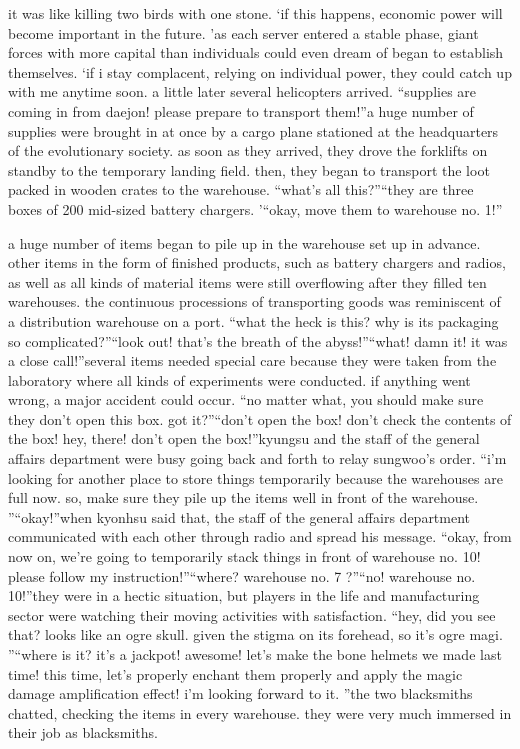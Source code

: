  it was like killing two birds with one stone.
‘if this happens, economic power will become important in the future.
’as each server entered a stable phase, giant forces with more capital than individuals could even dream of began to establish themselves.
‘if i stay complacent, relying on individual power, they could catch up with me anytime soon.
a little later several helicopters arrived.
“supplies are coming in from daejon! please prepare to transport them!”a huge number of supplies were brought in at once by a cargo plane stationed at the headquarters of the evolutionary society.
as soon as they arrived, they drove the forklifts on standby to the temporary landing field.
 then, they began to transport the loot packed in wooden crates to the warehouse.
“what’s all this?”“they are three boxes of 200 mid-sized battery chargers.
’“okay, move them to warehouse no.
 1!”

a huge number of items began to pile up in the warehouse set up in advance.
other items in the form of finished products, such as battery chargers and radios, as well as all kinds of material items were still overflowing after they filled ten warehouses.
the continuous processions of transporting goods was reminiscent of a distribution warehouse on a port.
“what the heck is this? why is its packaging so complicated?”“look out! that’s the breath of the abyss!”“what! damn it! it was a close call!”several items needed special care because they were taken from the laboratory where all kinds of experiments were conducted.
 if anything went wrong, a major accident could occur.
“no matter what, you should make sure they don’t open this box.
 got it?”“don’t open the box! don’t check the contents of the box! hey, there! don’t open the box!”kyungsu and the staff of the general affairs department were busy going back and forth to relay sungwoo’s order.
“i’m looking for another place to store things temporarily because the warehouses are full now.
 so, make sure they pile up the items well in front of the warehouse.
”“okay!”when kyonhsu said that, the staff of the general affairs department communicated with each other through radio and spread his message.
“okay, from now on, we’re going to temporarily stack things in front of warehouse no.
 10! please follow my instruction!”“where? warehouse no.
 7 ?”“no! warehouse no.
 10!”they were in a hectic situation, but players in the life and manufacturing sector were watching their moving activities with satisfaction.
“hey, did you see that? looks like an ogre skull.
 given the stigma on its forehead, so it’s ogre magi.
”“where is it? it’s a jackpot! awesome! let’s make the bone helmets we made last time! this time, let’s properly enchant them properly and apply the magic damage amplification effect! i’m looking forward to it.
”the two blacksmiths chatted, checking the items in every warehouse.
 they were very much immersed in their job as blacksmiths.


 